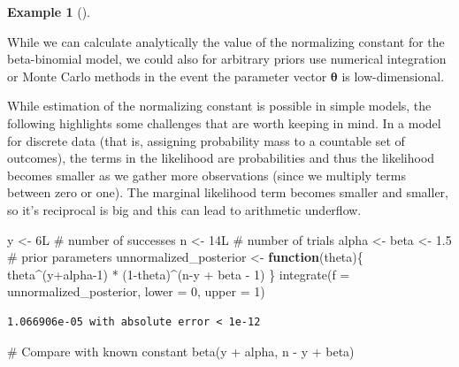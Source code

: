 \documentclass[
  11pt,
  letterpaper,
]{scrbook}
\newenvironment{Shaded}{\begin{snugshade}}{\end{snugshade}}
\newcommand{\AttributeTok}[1]{\textcolor[rgb]{0.40,0.45,0.13}{#1}}
\newcommand{\CommentTok}[1]{\textcolor[rgb]{0.37,0.37,0.37}{#1}}
\newcommand{\ControlFlowTok}[1]{\textcolor[rgb]{0.00,0.23,0.31}{\textbf{#1}}}
\newcommand{\DecValTok}[1]{\textcolor[rgb]{0.68,0.00,0.00}{#1}}
\newcommand{\FloatTok}[1]{\textcolor[rgb]{0.68,0.00,0.00}{#1}}
\newcommand{\FunctionTok}[1]{\textcolor[rgb]{0.28,0.35,0.67}{#1}}
\newcommand{\NormalTok}[1]{\textcolor[rgb]{0.00,0.23,0.31}{#1}}
\newcommand{\OtherTok}[1]{\textcolor[rgb]{0.00,0.23,0.31}{#1}}
\newcommand{\SpecialCharTok}[1]{\textcolor[rgb]{0.37,0.37,0.37}{#1}}
\theoremstyle{definition}
\theoremstyle{definition}
\newtheorem{example}{Example}[chapter]
\theoremstyle{definition}
\theoremstyle{plain}
\theoremstyle{plain}
\theoremstyle{remark}
\begin{document}
\begin{example}[]\protect\hypertarget{exm-numericalintegration}{}\label{exm-numericalintegration}

While we can calculate analytically the value of the normalizing
constant for the beta-binomial model, we could also for arbitrary priors
use numerical integration or Monte Carlo methods in the event the
parameter vector \(\boldsymbol{\theta}\) is low-dimensional.

While estimation of the normalizing constant is possible in simple
models, the following highlights some challenges that are worth keeping
in mind. In a model for discrete data (that is, assigning probability
mass to a countable set of outcomes), the terms in the likelihood are
probabilities and thus the likelihood becomes smaller as we gather more
observations (since we multiply terms between zero or one). The marginal
likelihood term becomes smaller and smaller, so it's reciprocal is big
and this can lead to arithmetic underflow.

\begin{Shaded}
\begin{Highlighting}[]
\NormalTok{y }\OtherTok{\textless{}{-}} \DecValTok{6}\NormalTok{L }\CommentTok{\# number of successes }
\NormalTok{n }\OtherTok{\textless{}{-}} \DecValTok{14}\NormalTok{L }\CommentTok{\# number of trials}
\NormalTok{alpha }\OtherTok{\textless{}{-}}\NormalTok{ beta }\OtherTok{\textless{}{-}} \FloatTok{1.5} \CommentTok{\# prior parameters}
\NormalTok{unnormalized\_posterior }\OtherTok{\textless{}{-}} \ControlFlowTok{function}\NormalTok{(theta)\{}
\NormalTok{  theta}\SpecialCharTok{\^{}}\NormalTok{(y}\SpecialCharTok{+}\NormalTok{alpha}\DecValTok{{-}1}\NormalTok{) }\SpecialCharTok{*}\NormalTok{ (}\DecValTok{1}\SpecialCharTok{{-}}\NormalTok{theta)}\SpecialCharTok{\^{}}\NormalTok{(n}\SpecialCharTok{{-}}\NormalTok{y }\SpecialCharTok{+}\NormalTok{ beta }\SpecialCharTok{{-}} \DecValTok{1}\NormalTok{)}
\NormalTok{\}}
\FunctionTok{integrate}\NormalTok{(}\AttributeTok{f =}\NormalTok{ unnormalized\_posterior,}
          \AttributeTok{lower =} \DecValTok{0}\NormalTok{,}
          \AttributeTok{upper =} \DecValTok{1}\NormalTok{)}
\end{Highlighting}
\end{Shaded}

\begin{verbatim}
1.066906e-05 with absolute error < 1e-12
\end{verbatim}

\begin{Shaded}
\begin{Highlighting}[]
\CommentTok{\# Compare with known constant}
\FunctionTok{beta}\NormalTok{(y }\SpecialCharTok{+}\NormalTok{ alpha, n }\SpecialCharTok{{-}}\NormalTok{ y }\SpecialCharTok{+}\NormalTok{ beta)}
\end{Highlighting}
\end{Shaded}


\end{example}
\end{document}
